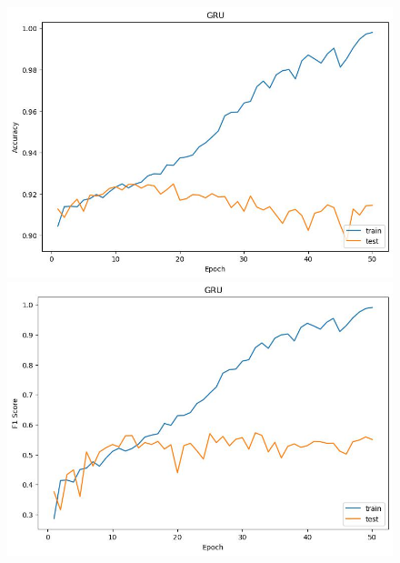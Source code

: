 \documentclass[UTF8]{article}
\begin{document}
\begin{figure}[h]
    \centering
    \begin{minipage}{.43\linewidth}
        \centering
        \includegraphics[width=\linewidth]{../figure/GRU_Accuracy.jpg}
    \end{minipage}
    \begin{minipage}{.43\linewidth}
        \centering
        \includegraphics[width=\linewidth]{../figure/GRU_F1.jpg}
    \end{minipage}
    

\end{figure}
\end{document}
